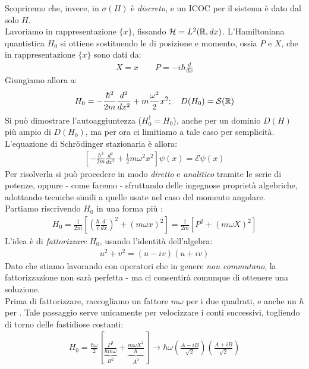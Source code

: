 \documentclass[../../FisicaTeorica.tex]{subfiles}
\begin{document}
Scopriremo che, invece, in \MQ $\sigma(H)$ è \textit{discreto}, e un ICOC per il sistema è dato dal solo $H$.\\
Lavoriamo in rappresentazione $\{x\}$, fissando $\mathcal{H}=L^2(\mathbb{R},dx)$. L'Hamiltoniana quantistica $H_0$ si ottiene sostituendo le  di posizione e momento, ossia $P$ e $X$, che in rappresentazione $\{x\}$ sono dati da:
\begin{align*}
X = x \qquad P=-i\hbar\frac{d}{dx}
\end{align*}
Giungiamo allora a:
\[
H_0 = -\frac{\hbar^2}{2m}\frac{d^2}{dx^2}+m\frac{\omega^2}{2}x^2; \quad D(H_0)=\mathcal{S}(\mathbb{R})
\]
Si può dimostrare l'autoaggiuntezza ($H_0^\dag = H_0$), anche per un dominio $D(H)$ più ampio di $D(H_0)$, ma per ora ci limitiamo a tale caso per semplicità.\\
L'equazione di Schr\"odinger stazionaria è allora:
\begin{align*}
\left[-\frac{\hbar^2}{2m} \frac{d^2}{dx^2} + \frac{1}{2}m\omega^2 x^2\right]\psi(x) = \mathcal{E}\psi(x)
\end{align*}
Per risolverla si può procedere in modo \textit{diretto} e \textit{analitico} tramite le serie di potenze, oppure - come faremo - sfruttando delle ingegnose proprietà algebriche, adottando tecniche simili a quelle usate nel caso del momento angolare.\\
Partiamo riscrivendo $H_0$ in una forma più :
\begin{align*}
H_0 = \frac{1}{2m}\left[\left(\frac{\hbar}{i}\frac{d}{dx}\right)^2 + (m\omega x)^2 \right]=\frac{1}{2m}\left[P^2+(m\omega X)^2\right]
\end{align*}
L'idea è di \textit{fattorizzare} $H_0$, usando l'identità dell'algebra:
\begin{align*}
u^2+v^2 = (u-iv)(u+iv)
\end{align*}
Dato che stiamo lavorando con operatori che in genere \textit{non commutano}, la fattorizzazione non sarà perfetta - ma ci consentirà comunque di ottenere una soluzione.\\
Prima di fattorizzare, raccogliamo un fattore $m\omega$ per  i due quadrati, e anche un $\hbar$ per . Tale passaggio serve unicamente per velocizzare i conti successivi, togliendo di torno delle fastidiose costanti:
\begin{align*}
H_0 = \frac{\hbar\omega}{2}\left[\underbrace{\frac{P^2}{\hbar m\omega}}_{B^2} + \underbrace{\frac{m\omega X^2}{\hbar}}_{A^2}\right] \to \hbar \omega \left(\frac{A-iB}{\sqrt{2}}\right)\left(\frac{A+iB}{\sqrt{2}}\right)
\end{align*}
\end{document}
